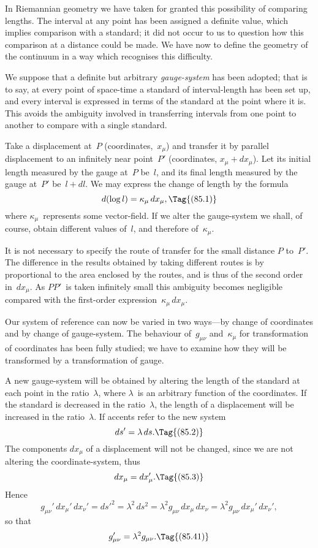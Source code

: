 \documentclass[12pt]{book}
\begin{document}
In Riemannian geometry we have taken for granted this possibility of
comparing lengths. The interval at any point has been assigned a definite
value, which implies comparison with a standard; it did not occur to us to
question how this comparison at a distance could be made. We have now to
define the geometry of the continuum in a way which recognises this difficulty.

We suppose that a definite but arbitrary \emph{gauge-system} has been adopted;
%
that is to say, at every point of space-time a standard of interval-length has
been set up, and every interval is expressed in terms of the standard at the
point where it is. This avoids the ambiguity involved in transferring intervals
from one point to another to compare with a single standard.

Take a displacement at~$P$ (coordinates,~$x_{\mu}$) and transfer it by parallel displacement
to an infinitely near point~$P'$ (coordinates, $x_{\mu} + dx_{\mu}$). Let its initial
length measured by the gauge at~$P$ be~$l$, and its final length measured by the
gauge at~$P'$ be~$l + dl$. We may express the change of length by the formula
\[
d(\log l) = \kappa_{\mu}\, dx_{\mu},
\Tag{(85.1)}
\]
where $\kappa_{\mu}$~represents some vector-field. If we alter the gauge-system we shall,
of course, obtain different values of~$l$, and therefore of~$\kappa_{\mu}$.

It is not necessary to specify the route of transfer for the small distance
$P$ to~$P'$. The difference in the results obtained by taking different routes is
by~ proportional to the area enclosed by the routes, and is thus of the
second order in~$dx_{\mu}$. As $PP'$~is taken infinitely small this ambiguity becomes
negligible compared with the first-order expression~$\kappa_{\mu}\, dx_{\mu}$.

Our system of reference can now be varied in two ways---by change of
coordinates and by change of gauge-system. The behaviour of~$g_{\mu\nu}$ and~$\kappa_{\mu}$ for
transformation of coordinates has been fully studied; we have to examine how
they will be transformed by a transformation of gauge.

A new gauge-system will be obtained by altering the length of the standard
at each point in the ratio~$\lambda$, where $\lambda$~is an arbitrary function of the coordinates.
If the standard is decreased in the ratio~$\lambda$, the length of a displacement will
be increased in the ratio~$\lambda$. If accents refer to the new system
\[
ds' = \lambda\, ds.
\Tag{(85.2)}
\]
The components $dx_{\mu}$ of a displacement will not be changed, since we are not
altering the coordinate-system, thus
\[
dx_{\mu} = dx_{\mu}'.
\Tag{(85.3)}
\]
Hence
\[
g_{\mu\nu}'\, dx_{\mu}'\, dx_{\nu}'
= ds'^{2}
= \lambda^{2}\, ds^{2}
= \lambda^{2} g_{\mu\nu}\, dx_{\mu}\, dx_{\nu}
= \lambda^{2} g_{\mu\nu}\, dx_{\mu}'\, dx_{\nu}',
\]
so that
\[
g_{\mu\nu}' = \lambda^{2} g_{\mu\nu}.
\Tag{(85.41)}
\]
\end{document}
